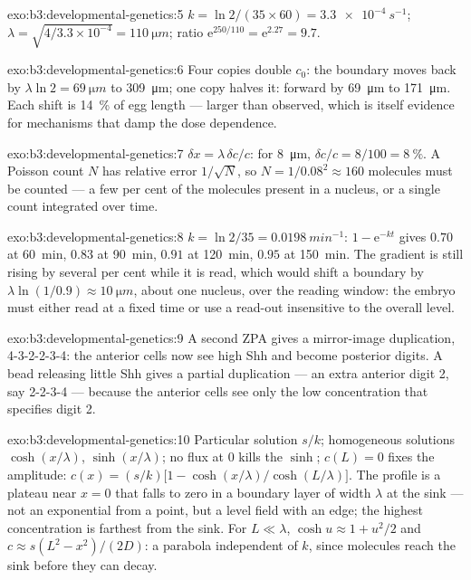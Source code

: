\begin{solution}{exo:b3:developmental-genetics:5}
$k = \ln 2/(35\times 60) = \qty{3.3e-4}{s^{-1}}$; $\lambda = \sqrt{4/
3.3\times 10^{-4}} = \qty{110}{\micro m}$; ratio $\mathrm{e}^{250/110}
= \mathrm{e}^{2.27} = 9.7$.
\end{solution}

\begin{solution}{exo:b3:developmental-genetics:6}
Four copies double $c_{0}$: the boundary moves back by $\lambda\ln 2 =
\qty{69}{\micro m}$ to \qty{309}{\micro m}; one copy halves it: forward
by \qty{69}{\micro m} to \qty{171}{\micro m}. Each shift is
\qty{14}{\%} of egg length --- larger than observed, which is itself
evidence for mechanisms that damp the dose dependence.
\end{solution}

\begin{solution}{exo:b3:developmental-genetics:7}
$\delta x = \lambda\,\delta c/c$: for \qty{8}{\micro m}, $\delta c/c =
8/100 = \qty{8}{\%}$. A Poisson count $N$ has relative error
$1/\sqrt{N}$, so $N = 1/0.08^{2} \approx 160$ molecules must be counted
--- a few per cent of the molecules present in a nucleus, or a single
count integrated over time.
\end{solution}

\begin{solution}{exo:b3:developmental-genetics:8}
$k = \ln 2/35 = \qty{0.0198}{min^{-1}}$: $1 - \mathrm{e}^{-kt}$ gives
$0.70$ at \qty{60}{min}, $0.83$ at \qty{90}{min}, $0.91$ at
\qty{120}{min}, $0.95$ at \qty{150}{min}. The gradient is still rising
by several per cent while it is read, which would shift a boundary by
$\lambda\ln(1/0.9) \approx \qty{10}{\micro m}$, about one nucleus, over
the reading window: the embryo must either read at a fixed time or use
a read-out insensitive to the overall level.
\end{solution}

\begin{solution}{exo:b3:developmental-genetics:9}
A second ZPA gives a mirror-image duplication, 4-3-2-2-3-4: the
anterior cells now see high Shh and become posterior digits. A bead
releasing little Shh gives a partial duplication --- an extra anterior
digit 2, say 2-2-3-4 --- because the anterior cells see only the low
concentration that specifies digit 2.
\end{solution}

\begin{solution}{exo:b3:developmental-genetics:10}
Particular solution $s/k$; homogeneous solutions $\cosh(x/\lambda)$,
$\sinh(x/\lambda)$; no flux at $0$ kills the $\sinh$; $c(L) = 0$ fixes
the amplitude: $c(x) = (s/k)\bigl[1 - \cosh(x/\lambda)/\cosh(L/\lambda)\bigr]$.
The profile is a plateau near $x = 0$ that falls to zero in a boundary
layer of width $\lambda$ at the sink --- not an exponential from a
point, but a level field with an edge; the highest concentration is
farthest from the sink. For $L \ll \lambda$, $\cosh u \approx 1 +
u^{2}/2$ and $c \approx s(L^{2} - x^{2})/(2D)$: a parabola independent
of $k$, since molecules reach the sink before they can decay.
\end{solution}

